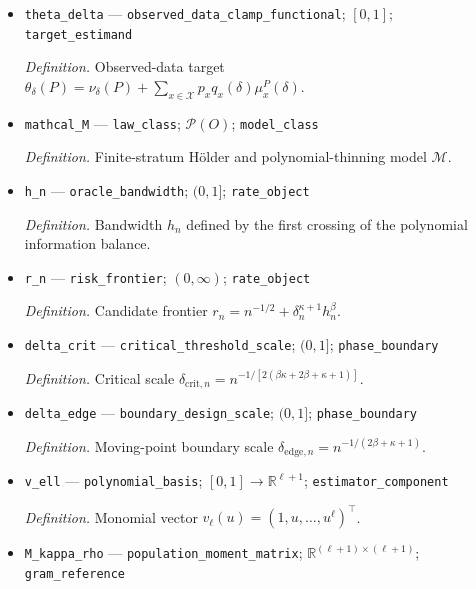 \documentclass{article}
\begin{document}
\begin{itemize}
  \item \texttt{theta\_\allowbreak{}delta} --- \texttt{observed\_\allowbreak{}data\_\allowbreak{}clamp\_\allowbreak{}functional}; \([0,1]\); \texttt{target\_\allowbreak{}estimand}
  \par\smallskip\noindent\emph{Definition.} Observed-data target \(\theta_\delta(P)=\nu_\delta(P)+\sum_{x\in\mathcal X}p_xq_x(\delta)\mu_x^P(\delta)\).
  \item \texttt{mathcal\_\allowbreak{}M} --- \texttt{law\_\allowbreak{}class}; \(\mathcal P(O)\); \texttt{model\_\allowbreak{}class}
  \par\smallskip\noindent\emph{Definition.} Finite-stratum Hölder and polynomial-thinning model \(\mathcal M\).
  \item \texttt{h\_\allowbreak{}n} --- \texttt{oracle\_\allowbreak{}bandwidth}; \((0,1]\); \texttt{rate\_\allowbreak{}object}
  \par\smallskip\noindent\emph{Definition.} Bandwidth \(h_n\) defined by the first crossing of the polynomial information balance.
  \item \texttt{r\_\allowbreak{}n} --- \texttt{risk\_\allowbreak{}frontier}; \((0,\infty)\); \texttt{rate\_\allowbreak{}object}
  \par\smallskip\noindent\emph{Definition.} Candidate frontier \(r_n=n^{-1/2}+\delta_n^{\kappa+1}h_n^\beta\).
  \item \texttt{delta\_\allowbreak{}crit} --- \texttt{critical\_\allowbreak{}threshold\_\allowbreak{}scale}; \((0,1]\); \texttt{phase\_\allowbreak{}boundary}
  \par\smallskip\noindent\emph{Definition.} Critical scale \(\delta_{\mathrm{crit},n}=n^{-1/[2(\beta\kappa+2\beta+\kappa+1)]}\).
  \item \texttt{delta\_\allowbreak{}edge} --- \texttt{boundary\_\allowbreak{}design\_\allowbreak{}scale}; \((0,1]\); \texttt{phase\_\allowbreak{}boundary}
  \par\smallskip\noindent\emph{Definition.} Moving-point boundary scale \(\delta_{\mathrm{edge},n}=n^{-1/(2\beta+\kappa+1)}\).
  \item \texttt{v\_\allowbreak{}ell} --- \texttt{polynomial\_\allowbreak{}basis}; \([0,1]\to\mathbb R^{\ell+1}\); \texttt{estimator\_\allowbreak{}component}
  \par\smallskip\noindent\emph{Definition.} Monomial vector \(v_\ell(u)=(1,u,\ldots,u^\ell)^\top\).
  \item \texttt{M\_\allowbreak{}kappa\_\allowbreak{}rho} --- \texttt{population\_\allowbreak{}moment\_\allowbreak{}matrix}; \(\mathbb R^{(\ell+1)\times(\ell+1)}\); \texttt{gram\_\allowbreak{}reference}

\end{itemize}
\end{document}
